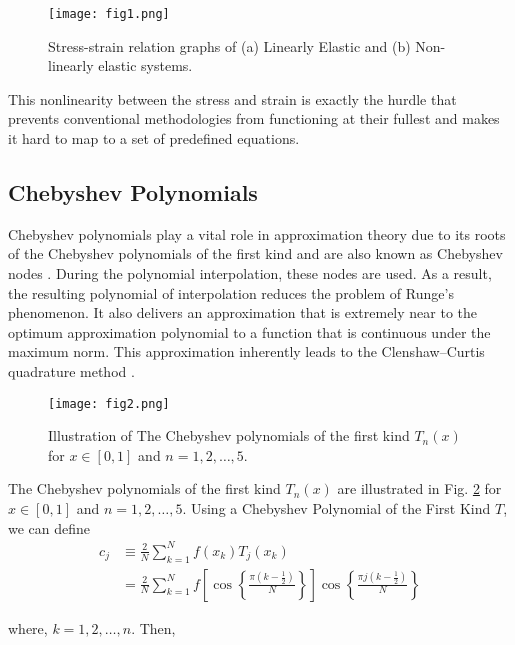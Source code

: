 \documentclass[conference]{IEEEtran}
\begin{document}
\begin{figure}[htbp]
\centerline{\texttt{[image: fig1.png]}}
\caption{Stress-strain relation graphs of (a) Linearly Elastic and (b) Non-linearly elastic systems.}
\label{fig1}
\end{figure}

This nonlinearity between the stress and strain is exactly the hurdle that prevents conventional methodologies from functioning at their fullest and makes it hard to map to a set of predefined equations.

\subsection{Chebyshev Polynomials}
Chebyshev polynomials play a vital role in approximation theory \cite{20} due to its roots of the Chebyshev polynomials of the first kind and are also known as Chebyshev nodes \cite{21}. During the polynomial interpolation, these nodes are used. As a result, the resulting polynomial of interpolation reduces the problem of Runge's phenomenon. It also delivers an approximation that is extremely near to the optimum approximation polynomial to a function that is continuous under the maximum norm. This approximation inherently leads to the Clenshaw–Curtis quadrature method \cite{22}. 

\begin{figure}[htbp]
\centerline{\texttt{[image: fig2.png]}}
\caption{Illustration of The Chebyshev polynomials of the first kind ${T_n}\left( x \right)$ for $x \in \left[ {0,1} \right]$ and $n = 1,2, \ldots ,5$.}
\label{fig2}
\end{figure}

The Chebyshev polynomials of the first kind ${T_n}\left( x \right)$ are illustrated in Fig. \ref{fig2} for $x \in \left[ {0,1} \right]$ and $n = 1,2, \ldots ,5$. Using a Chebyshev Polynomial of the First Kind $T$, we can define 
\begin{align}
   {{c}_{j}} &\equiv \frac{2}{N}\sum\limits_{k=1}^{N}{f\left( {{x}_{k}} \right)}{{T}_{j}}\left( {{x}_{k}} \right) \\ 
  &=\frac{2}{N}\sum\limits_{k=1}^{N}{f\left[ \cos \left\{ \frac{\pi \left( k-\frac{1}{2} \right)}{N} \right\} \right]}\cos \left\{ \frac{\pi j\left( k-\frac{1}{2} \right)}{N} \right\}  
\tag{1}\label{tag1}
\end{align}



where, $k = 1,2, \ldots ,n$. Then, 
\end{document}
